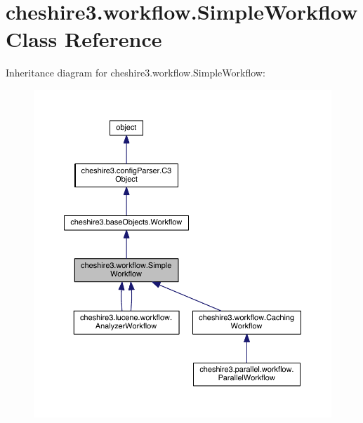 \hypertarget{classcheshire3_1_1workflow_1_1_simple_workflow}{\section{cheshire3.\-workflow.\-Simple\-Workflow Class Reference}
\label{classcheshire3_1_1workflow_1_1_simple_workflow}
}


Inheritance diagram for cheshire3.\-workflow.\-Simple\-Workflow\-:
\nopagebreak
\begin{figure}[H]
\begin{center}
\leavevmode
\includegraphics[width=350pt]{classcheshire3_1_1workflow_1_1_simple_workflow__inherit__graph}
\end{center}
\end{figure}


